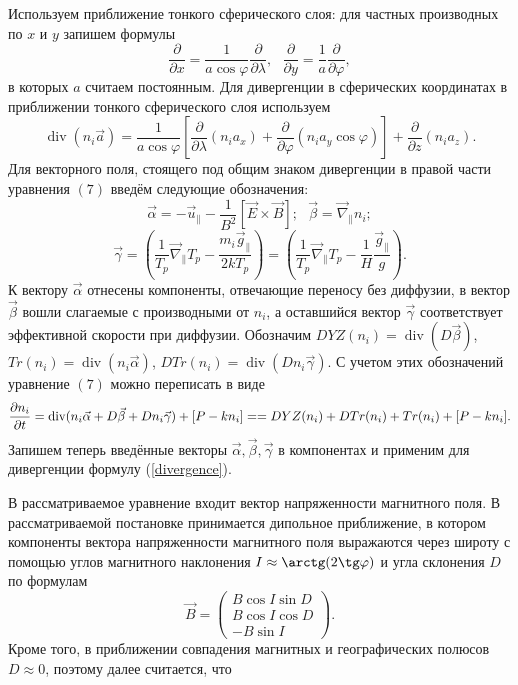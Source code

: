 \documentclass[14pt, a4paper]{extarticle}
\renewcommand{\div}{\operatorname{div}}
\begin{document}
Используем приближение тонкого сферического слоя: для частных производных по $x$ и $y$ запишем формулы $$\dfrac{\partial}{\partial x}=\dfrac{1}{a\cos\varphi}\dfrac{\partial}{\partial\lambda},\mbox{ } \dfrac{\partial}{\partial y} = \dfrac{1}{a}\dfrac{\partial}{\partial\varphi},$$ в которых $a$ считаем постоянным. Для дивергенции в сферических координатах в приближении тонкого сферического слоя используем \begin{equation}\label{divergence}\div(n_i \vec{a}) = \dfrac{1}{a\cos\varphi}\left[\dfrac{\partial}{\partial\lambda}(n_i a_x)+\dfrac{\partial}{\partial\varphi}(n_i a_y\cos\varphi)\right]+\dfrac{\partial}{\partial z}(n_i a_z).\end{equation}
Для векторного поля, стоящего под общим знаком дивергенции в правой части уравнения $(7)$ введём следующие обозначения: $$\vec{\alpha}=-\vec{u}_\parallel-\dfrac{1}{B^2}[\vec{E}\times\vec{B}]; \mbox{ }\vec{\beta} = \vec{\nabla}_\parallel n_i;$$ $$\vec{\gamma} = \left(\dfrac{1}{T_p}\vec{\nabla}_\parallel  T_p - \dfrac{m_i \vec{g}_\parallel}{2kT_p}\right)=\left(\dfrac{1}{T_p}\vec{\nabla}_\parallel  T_p - \dfrac{1}{H}\dfrac{\vec{g}_\parallel}{g}\right).$$
К вектору $\vec{\alpha}$ отнесены компоненты, отвечающие переносу без диффузии, в вектор $\vec{\beta}$ вошли слагаемые с производными от $n_i$, а оставшийся вектор $\vec{\gamma}$ соответствует эффективной скорости при диффузии. Обозначим $DYZ(n_i) = \div(D\vec{\beta})$, $Tr(n_i) = \div(n_i\vec{\alpha})$, $DTr(n_i) = \div(Dn_i\vec{\gamma})$. С учетом этих обозначений уравнение $(7)$ можно переписать в виде \begin{equation}\label{main_eq}\dfrac{\partial n_i}{\partial t} = \div(n_i\vec{\alpha} + D\vec{\beta}+Dn_i\vec{\gamma})+[P-kn_i]=$$ $$=DYZ(n_i)+DTr(n_i)+Tr(n_i)+[P-kn_i]. \end{equation}
Запишем теперь введённые векторы $\vec{\alpha}, \vec{\beta}, \vec{\gamma}$ в компонентах и применим для дивергенции формулу (\ref{divergence}). 

В рассматриваемое уравнение входит вектор напряженности магнитного поля. В рассматриваемой постановке принимается дипольное приближение, в котором компоненты вектора напряженности магнитного поля выражаются через широту с помощью углов магнитного наклонения $I\approx \arctg(2\tg\varphi)$ и угла склонения $D$ по формулам
\begin{equation}\label{magn_field}\vec{B} = \left(\begin{array}{crl}
B\cos I \sin D\\
B\cos I \cos D\\
-B\sin I
\end{array}\right).\end{equation}
Кроме того, в приближении совпадения магнитных и географических полюсов $D\approx 0$, поэтому далее считается, что 
\end{document}
